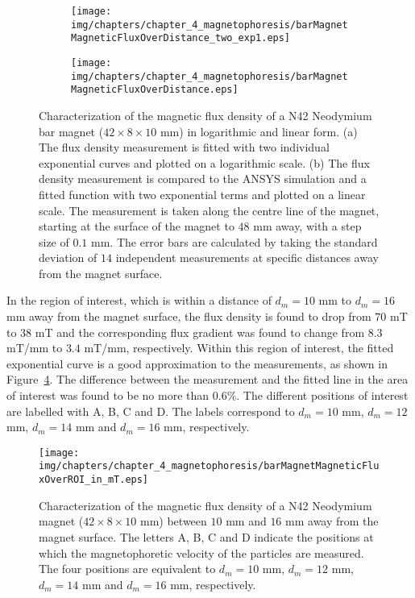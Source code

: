 \begin{figure}[htb]
	\centering
    \begin{subfigure}[b]{0.48\textwidth}
		\texttt{[image: img/chapters/chapter\_4\_magnetophoresis/barMagnetMagneticFluxOverDistance\_two\_exp1.eps]}
         \caption{}  
		\label{fig:barMagnetMagneticFluxOverDistance_log_two}            
	\end{subfigure}
	\hfill
    \begin{subfigure}[b]{0.48\textwidth}
		\texttt{[image: img/chapters/chapter\_4\_magnetophoresis/barMagnetMagneticFluxOverDistance.eps]}
         \caption{}    
		\label{fig:barMagnetMagneticFluxOverDistance_log}            
	\end{subfigure}
    \caption[Magnetic flux density of a N42 Neodymium bar magnet along its centre line]{Characterization of the magnetic flux density of a N42 Neodymium bar magnet ($42\times8\times10$ mm) in logarithmic and linear form. (a) The flux density measurement is fitted with two individual exponential curves and plotted on a logarithmic scale. (b) The flux density measurement is compared to the ANSYS simulation and a fitted function with two exponential terms and plotted on a linear scale. The measurement is taken along the centre line of the magnet, starting at the surface of the magnet to $48$ mm away, with a step size of $0.1$ mm. The error bars are calculated by taking the standard deviation of $14$ independent measurements at specific distances away from the magnet surface.}
        \label{fig:barMagnetFluxDensityOverDistance}
\end{figure}

In the region of interest, which is within a distance of $d_{m}=10$ mm to $d_{m}=16$ mm away from the magnet surface, the flux density is found to drop from $70$ mT to $38$ mT and the corresponding flux gradient was found to change from $8.3$ mT/mm to $3.4$ mT/mm, respectively. Within this region of interest, the fitted exponential curve is a good approximation to the measurements, as shown in Figure~\ref{fig:barMagnetFluxDensityOverROI}. The difference between the measurement and the fitted line in the area of interest was found to be no more than $0.6\%$. The different positions of interest are labelled with A, B, C and D. The labels correspond to $d_{m} = 10$ mm, $d_{m} = 12$ mm, $d_{m} = 14$ mm and $d_{m} = 16$ mm, respectively.

\begin{figure}[htb]
   \centering
   \texttt{[image: img/chapters/chapter\_4\_magnetophoresis/barMagnetMagneticFluxOverROI\_in\_mT.eps]}
   \caption[Magnetic flux density of a N42 Neodymium bar magnet around the region of interest]{Characterization of the magnetic flux density of a N42 Neodymium magnet ($42\times8\times10$ mm) between $10$ mm and $16$ mm away from the magnet surface. The letters A, B, C and D indicate the positions at which the magnetophoretic velocity of the particles are measured. The four positions are equivalent to $d_{m} = 10$ mm, $d_{m} = 12$ mm, $d_{m} = 14$ mm and $d_{m} = 16$ mm, respectively.}
   \label{fig:barMagnetFluxDensityOverROI}
\end{figure}

